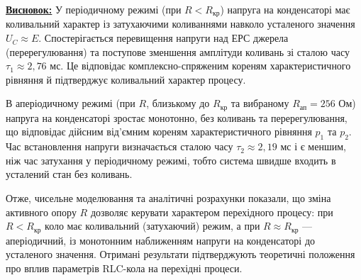 \documentclass[12pt,a4paper]{article}
\begin{document}
    \noindent
    \textbf{\underline{Висновок:}} У періодичному режимі (при $R < R_{\text{кр}}$) напруга на конденсаторі має коливальний характер із затухаючими коливаннями навколо усталеного значення $U_C \approx E$. Спостерігається перевищення напруги над ЕРС джерела (перерегулювання) та поступове зменшення амплітуди коливань зі сталою часу $\tau_1 \approx 2{,}76$ мс. Це відповідає комплексно-спряженим кореням характеристичного рівняння й підтверджує коливальний характер процесу.

В аперіодичному режимі (при $R$, близькому до $R_{\text{кр}}$ та вибраному $R_{\text{ап}} = 256$ Ом) напруга на конденсаторі зростає монотонно, без коливань та перерегулювання, що відповідає дійсним від'ємним кореням характеристичного рівняння $p_1$ та $p_2$. Час встановлення напруги визначається сталою часу $\tau_2 \approx 2{,}19$ мс і є меншим, ніж час затухання у періодичному режимі, тобто система швидше входить в усталений стан без коливань.

Отже, чисельне моделювання та аналітичні розрахунки показали, що зміна активного опору $R$ дозволяє керувати характером перехідного процесу: при $R < R_{\text{кр}}$ коло має коливальний (затухаючий) режим, а при $R \approx R_{\text{кр}}$ — аперіодичний, із монотонним наближенням напруги на конденсаторі до усталеного значення. Отримані результати підтверджують теоретичні положення про вплив параметрів RLC-кола на перехідні процеси.
\end{document}
